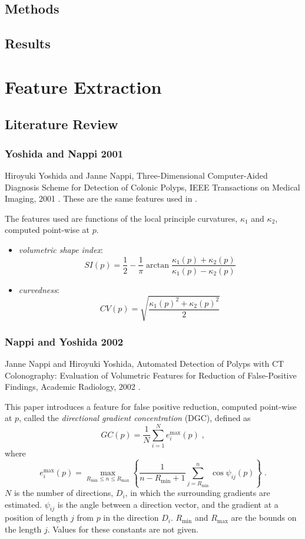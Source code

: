 \documentclass[12pt]{book}
\begin{document}
\chapter{Methods}

\chapter{Results}

%
\part{Feature Extraction}
\chapter{Literature Review}
\section{Yoshida and Nappi 2001}
Hiroyuki Yoshida and Janne Nappi, Three-Dimensional Computer-Aided
Diagnosis Scheme for Detection of Colonic Polyps, IEEE Transactions on
Medical Imaging, 2001 \cite{YoshidaN01}. These are the same features
used in \cite{YoshidaMMRD02}.

\par 
The features used are functions of the local principle
curvatures, $\kappa_1$ and $\kappa_2$, computed point-wise at $p$.
\begin{itemize}
\item {\it volumetric shape index}:
\[
SI(p) = \frac{1}{2}-\frac{1}{\pi}\arctan{\frac{\kappa_1(p)+\kappa_2(p)}{\kappa_1(p)-\kappa_2(p)}}
\]
\item {\it curvedness}:
\[
CV(p) = \sqrt{\frac{\kappa_1(p)^2 + \kappa_2(p)^2}{2}} 
\]
\end{itemize}

\section{Nappi and Yoshida 2002}
Janne Nappi and Hiroyuki Yoshida, Automated Detection of Polyps with
CT Colonography: Evaluation of Volumetric Features for Reduction of
False-Positive Findings, Academic Radiology, 2002 \cite{NappiY02}.
\par This paper introduces a feature for false positive reduction,
computed point-wise at $p$, called the
{\it directional gradient concentration} (DGC), defined as
\[
GC(p)=\frac{1}{N}\sum_{i=1}^{N} e_i^{\max}(p) \; ,
\]
where 
\[
e_i^{\max}(p) = \max_{R_{\min} \leq n \leq R_{\max}}
\left\{ 
\frac{1}{n-R_{\min}+1}\sum_{j=R_{\min}}^{n} \cos{\psi_{ij}(p)}
\right\} \; .
\]
$N$ is the number of directions, $D_i$, in which the surrounding
gradients are estimated. $\psi_{ij}$ is the angle between a direction
vector, and the gradient at a position of length $j$ from $p$ in the
direction $D_i$. $R_{\min}$ and $R_{\max}$ are the bounds on the
length $j$. Values for these constants are not given.
\end{document}
